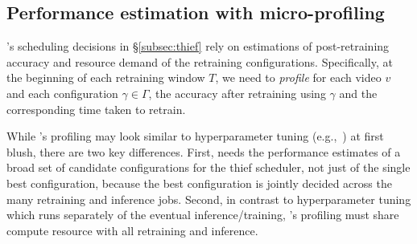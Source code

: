 \subsection{Performance estimation with micro-profiling}
\label{subsec:profiling}

{\name}'s scheduling decisions in \S\ref{subsec:thief} rely on estimations of post-retraining accuracy and resource demand of the retraining configurations. 
Specifically, at the beginning of each retraining window $T$, we need to {\em profile} for each video $v$ and each configuration $\gamma\in\Gamma$, the accuracy after retraining using $\gamma$ and the corresponding time taken to retrain.%

While \name's profiling may look similar to hyperparameter tuning (e.g.,~\cite{snoek2012practical,hyperband,hypersched,rubberband}) at first blush, there are two key differences. 
First, \name needs the performance estimates of a broad set of candidate configurations for the thief scheduler, not just of the single best configuration, because the best configuration is jointly decided across the many retraining and inference jobs. 
Second, in contrast to hyperparameter tuning which runs separately of the eventual inference/training, \name's profiling must share compute resource with all retraining and inference.%


